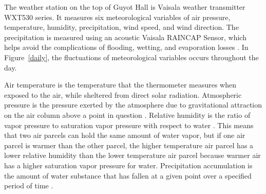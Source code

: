 \documentclass[11pt]{report}
\begin{document}
% 

The weather station on the top of Guyot Hall is Vaisala weather transmitter
WXT530 series. It measures six meteorological variables of air pressure,
temperature, humidity, precipitation, wind speed, and wind direction. The
precipitation is measured using an acoustic Vaisala RAINCAP Sensor, which helps
avoid the complications of flooding, wetting, and evaporation losses
\cite[]{Vaisala}. In Figure~\ref{daily}, the fluctuations of 
meteorological variables occurs throughout the day.   

Air temperature is the temperature that the thermometer measures when
exposed to the air, while sheltered from direct solar radiation.
Atmospheric pressure is the pressure exerted by the atmosphere due to
gravitational attraction on the air column above a point in question
\cite[]{AMS}. Relative humidity is the ratio of vapor pressure to saturation
vapor pressure with respect to water \cite[]{AMS}.  This means that two air
parcels can hold the same amount of water vapor, but if one air parcel is
warmer than the other parcel, the higher temperature air parcel has a lower
relative humidity than the lower temperature air parcel because warmer air
has a higher saturation vapor pressure for water.  Precipitation
accumulation is the amount of water substance that has fallen at a given
point over a specified period of time \cite[]{AMS}.

\end{document}
